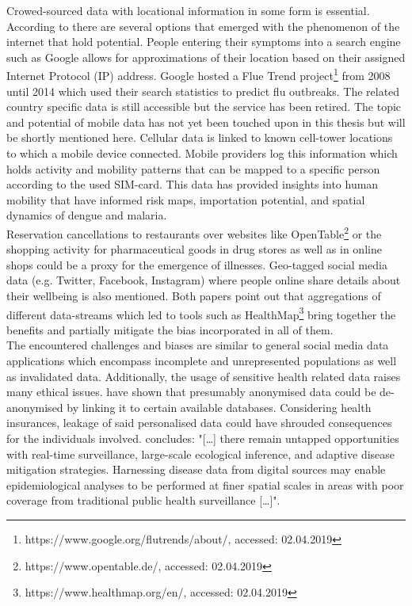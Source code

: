 Crowed-sourced data with locational information in some form is essential. According to \textcite{Lee2016, Schmidt2012} there are several options that emerged with the phenomenon of the internet that hold potential. People entering their symptoms into a search engine such as Google allows for approximations of their location based on their assigned Internet Protocol (IP) address. Google hosted a Flue Trend project\footnote{https://www.google.org/flutrends/about/, accessed: 02.04.2019} from 2008 until 2014 which used their search statistics to predict flu outbreaks. The related country specific data is still accessible but the service has been retired. The topic and potential of mobile data has not yet been touched upon in this thesis but will be shortly mentioned here. 
Cellular data is linked to known cell-tower locations to which a mobile device connected. Mobile providers log this information which holds activity and mobility patterns that can be mapped to a specific person according to the used SIM-card. This data has provided insights into human mobility that have informed risk maps, importation potential, and spatial dynamics of dengue and malaria. \parencite{Buckee2015b} \\
Reservation cancellations to restaurants over websites like OpenTable\footnote{https://www.opentable.de/, accessed: 02.04.2019} or the shopping activity for pharmaceutical goods in drug stores as well as in online shops could be a proxy for the emergence of illnesses. Geo-tagged social media data (e.g. Twitter, Facebook, Instagram) where people online share details about their wellbeing is also mentioned. Both papers point out that aggregations of different data-streams which led to tools such as HealthMap\footnote{https://www.healthmap.org/en/, accessed: 02.04.2019} bring together the benefits and partially mitigate the bias incorporated in all of them.\\
The encountered challenges and biases are similar to general social media data applications which encompass incomplete and unrepresented populations as well as invalidated data. Additionally, the usage of sensitive health related data raises many ethical issues. \textcite{DeMontjoye2013} have shown that presumably anonymised data could be de-anonymised by linking it to certain available databases. Considering health insurances, leakage of said personalised data could have shrouded consequences for the individuals involved.  
\textcite[p.410]{Lee2016} concludes: "[\dots] there remain untapped opportunities with real-time surveillance, large-scale ecological inference, and adaptive disease mitigation strategies. Harnessing disease data from digital sources may enable epidemiological analyses to be performed at finer spatial scales in areas with poor coverage from traditional public health surveillance [\dots]".

